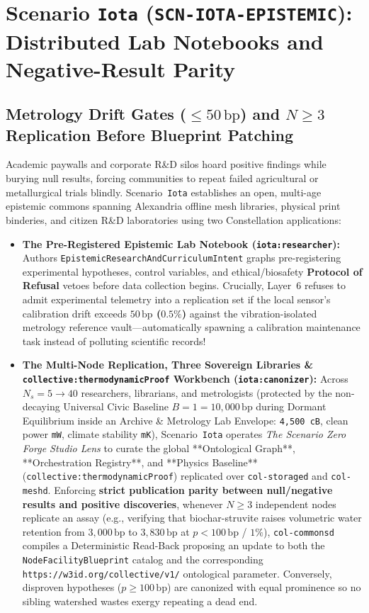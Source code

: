 \section{Scenario \texttt{Iota} (\texttt{SCN-IOTA-EPISTEMIC}): Distributed Lab Notebooks and Negative-Result Parity}
\label{sec:wave-e-iota}

\subsection{Metrology Drift Gates ($\le 50\,\mathrm{bp}$) and $N \ge 3$ Replication Before Blueprint Patching}

Academic paywalls and corporate R\&D silos hoard positive findings while burying null results, forcing communities to repeat failed agricultural or metallurgical trials blindly. Scenario~\texttt{Iota} establishes an open, multi-age epistemic commons spanning Alexandria offline mesh libraries, physical print binderies, and citizen R\&D laboratories using two Constellation applications:
\begin{itemize}
    \item \textbf{The Pre-Registered Epistemic Lab Notebook (\texttt{iota:researcher}):} Authors \texttt{EpistemicResearchAndCurriculumIntent} graphs pre-registering experimental hypotheses, control variables, and ethical/biosafety \textbf{Protocol of Refusal} vetoes before data collection begins. Crucially, Layer~6 refuses to admit experimental telemetry into a replication set if the local sensor's calibration drift exceeds \textbf{$50\,\mathrm{bp}$ ($0.5\%$)} against the vibration-isolated metrology reference vault---automatically spawning a calibration maintenance task instead of polluting scientific records!
    \item \textbf{The Multi-Node Replication, Three Sovereign Libraries \& \texttt{collective:thermodynamicProof} Workbench (\texttt{iota:canonizer}):} Across $N_s = 5 \to 40$ researchers, librarians, and metrologists (protected by the non-decaying Universal Civic Baseline $B = 1 = 10{,}000\,\mathrm{bp}$ during Dormant Equilibrium inside an Archive \& Metrology Lab Envelope: \texttt{4,500 cB}, clean power \texttt{mW}, climate stability \texttt{mK}), Scenario~\texttt{Iota} operates \textit{The Scenario Zero Forge Studio Lens} to curate the global **Ontological Graph**, **Orchestration Registry**, and **Physics Baseline** (\texttt{collective:thermodynamicProof}) replicated over \texttt{col-storaged} and \texttt{col-meshd}. Enforcing \textbf{strict publication parity between null/negative results and positive discoveries}, whenever $N \ge 3$ independent nodes replicate an assay (e.g., verifying that biochar-struvite raises volumetric water retention from $3{,}000\,\mathrm{bp}$ to $3{,}830\,\mathrm{bp}$ at $p < 100\,\mathrm{bp}$ / $1\%$), \texttt{col-commonsd} compiles a Deterministic Read-Back proposing an update to both the \texttt{NodeFacilityBlueprint} catalog and the corresponding \texttt{https://w3id.org/collective/v1/} ontological parameter. Conversely, disproven hypotheses ($p \ge 100\,\mathrm{bp}$) are canonized with equal prominence so no sibling watershed wastes exergy repeating a dead end.
\end{itemize}

